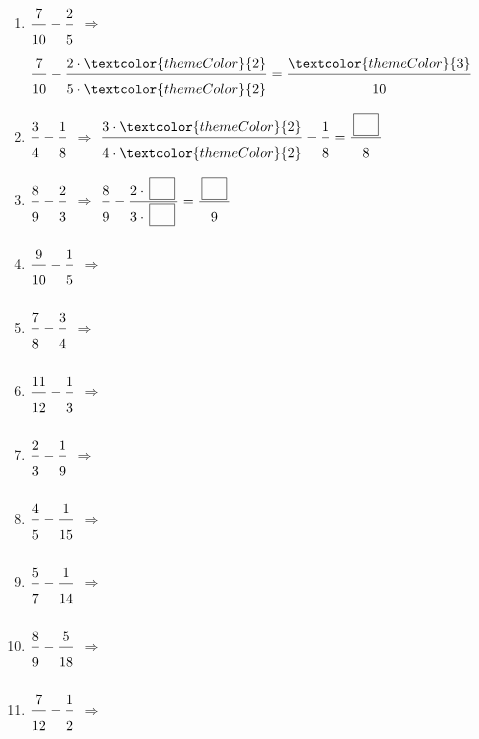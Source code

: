 \begin{enumerate}[leftmargin=*,align=parleft, label=\alph*), itemsep=9pt]
\item $\FA{7}{10}-\FA{2}{5}$ \quad $\Longrightarrow$ \quad $\FA{7}{10}-\FA{2 \cdot \textcolor{themeColor}{2}}{5 \cdot \textcolor{themeColor}{2}}=\FA{\textcolor{themeColor}{3}}{10}$
\item $\FA{3}{4}-\FA{1}{8}$ \quad $\Longrightarrow$ \quad $\FA{3 \cdot \textcolor{themeColor}{2}}{4 \cdot \textcolor{themeColor}{2}}-\FA{1}{8}=\FA{\CaseC}{8}$
\item $\FA{8}{9}-\FA{2}{3}$ \quad $\Longrightarrow$ \quad $\FA{8}{9}-\FA{2 \cdot \CaseC}{3 \cdot \CaseC}=\FA{\CaseC}{9}$
\item $\FA{9}{10}-\FA{1}{5}$ \quad $\Longrightarrow$
\item $\FA{7}{8}-\FA{3}{4}$ \quad $\Longrightarrow$
\item $\FA{11}{12}-\FA{1}{3}$ \quad $\Longrightarrow$
\item $\FA{2}{3}-\FA{1}{9}$ \quad $\Longrightarrow$
\item $\FA{4}{5}-\FA{1}{15}$ \quad $\Longrightarrow$
\item $\FA{5}{7}-\FA{1}{14}$ \quad $\Longrightarrow$
\item $\FA{8}{9}-\FA{5}{18}$ \quad $\Longrightarrow$
\item $\FA{7}{12}-\FA{1}{2}$ \quad $\Longrightarrow$
\end{enumerate}
 
\newpage
{}
 
